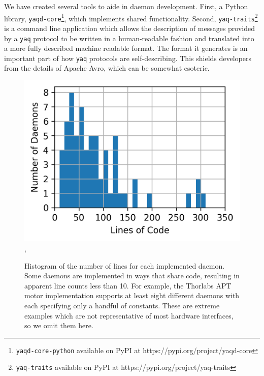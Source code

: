 \documentclass[aip, amsmath, amssymb, reprint,]{revtex4-2}
\newcommand\yaq{\texttt{yaq}}
\begin{document}
We have created several tools to aide in daemon development.
First, a Python library, \texttt{yaqd-core}\footnote{\texttt{yaqd-core-python} available on PyPI at https://pypi.org/project/yaqd-core}, which implements shared functionality.
Second, \texttt{yaq-traits}\footnote{\texttt{yaq-traits} available on PyPI at https://pypi.org/project/yaq-traits} is a command line application which allows the description of messages provided by a \yaq{} protocol to be written in a human-readable fashion and translated into a more fully described machine readable format.
The format it generates is an important part of how \yaq{} protocols are self-describing.
This shields developers from the details of Apache Avro, which can be somewhat esoteric.

\begin{figure}
\includegraphics[width=\columnwidth]{figures/lines_histogram},
	\caption{  \label{fig:histogram} Histogram of the number of lines for each implemented daemon.
	Some daemons are implemented in ways that share code, resulting in apparent line counts less than 10.
	For example, the Thorlabs APT\cite{thorlabs_apt} motor implementation supports at least eight different daemons with each specifying only a handful of constants.
	These are extreme examples which are not representative of most hardware interfaces, so we omit them here.
	}
\end{figure}
\end{document}
